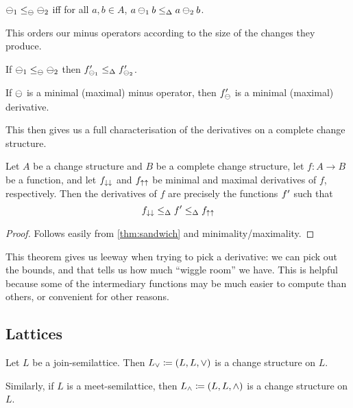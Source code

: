 \begin{defn}
  $\ominus_1 \leq_\ominus \ominus_2$ iff for all $a,b \in A$, $a \ominus_1 b
  \leq_\Delta a \ominus_2 b$.
\end{defn}

This orders our minus operators according to the size of the changes they
produce. 

\begin{prop}
  If $\ominus_1 \leq_\ominus \ominus_2$ then
  $f'_{\ominus_1} \leq_\Delta f'_{\ominus_2}$.
\end{prop}

\begin{prop}
  If $\ominus$ is a minimal (maximal) minus operator, then $f'_\ominus$
  is a minimal (maximal) derivative.
\end{prop}

This then gives us a full characterisation of the derivatives on a complete
change structure.

\begin{thm}
\label{thm:derivativeCharacterization}
  Let $A$ be a change structure and $B$ be a complete change structure, let
  $f: A \rightarrow B$ be a function, and let $f_{\downarrow\downarrow}$ and
  $f_{\uparrow\uparrow}$ be minimal and maximal derivatives of $f$, respectively.
  Then the derivatives of $f$ are precisely
  the functions $f'$ such that
  $$f_{\downarrow\downarrow} \leq_\Delta f' \leq_\Delta f_{\uparrow\uparrow}$$
\end{thm}
\begin{proof}
  Follows easily from \ref{thm:sandwich} and minimality/maximality.
\end{proof}

This theorem gives us leeway when trying to pick a derivative: we can pick out the
bounds, and that tells us how much ``wiggle room'' we have. This is helpful
because some of the intermediary functions may be much easier to compute than
others, or convenient for other reasons.

\subsection{Lattices}

\begin{defn}
  Let $L$ be a join-semilattice. Then $L_\vee \coloneqq (L,L,\vee)$ is a change
  structure on $L$.

  Similarly, if $L$ is a meet-semilattice, then $L_\wedge \coloneqq (L,L,\wedge)$ is a change
  structure on $L$.
\end{defn}

